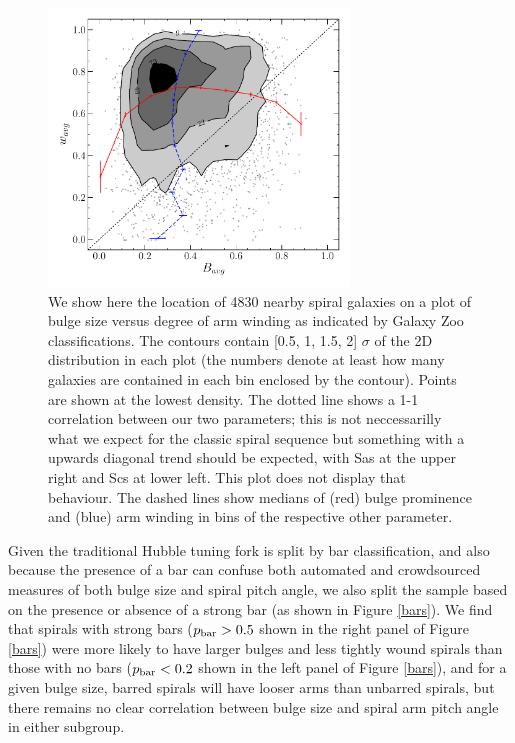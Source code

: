 \documentclass[usenatbib]{mn2e}
\begin{document}
 
 \begin{figure}
\includegraphics[width=80mm]{bulge_armwinding_rolling_median.pdf}
\caption{We show here the location of {4830} nearby spiral galaxies on a plot of bulge size versus degree of arm winding as indicated by Galaxy Zoo classifications. The contours contain [0.5, 1, 1.5, 2] $\sigma$ of the 2D distribution in each plot (the numbers denote at least how many galaxies are contained in each bin enclosed by the contour). Points are shown at the lowest density.  The dotted line shows a 1-1 correlation between our two parameters; this is not neccessarilly what we expect for the classic spiral sequence but something with a upwards diagonal trend should be expected, with Sas at the upper right and Scs at lower left. This plot does not display that behaviour. The dashed lines show medians of (red) bulge prominence and (blue) arm winding in bins of the respective other parameter.  \label{bulgewinding}}
\end{figure}
 
 Given the traditional Hubble tuning fork is split by bar classification, and also because the presence of a bar can confuse both automated and crowdsourced measures of both bulge size and spiral pitch angle, we also split the sample based on the presence or absence of a strong bar (as shown in Figure \ref{bars}). We find that spirals with strong bars ($p_{\rm bar}>0.5$ shown in the right panel of Figure \ref{bars}) were more likely to have larger bulges and less tightly wound spirals than those with no bars ($p_{\rm bar} < 0.2$ shown in the left panel of Figure \ref{bars}), and for a given bulge size, barred spirals will have looser arms than unbarred spirals, but there remains no clear correlation between bulge size and spiral arm pitch angle in either subgroup.  
  
\end{document}
